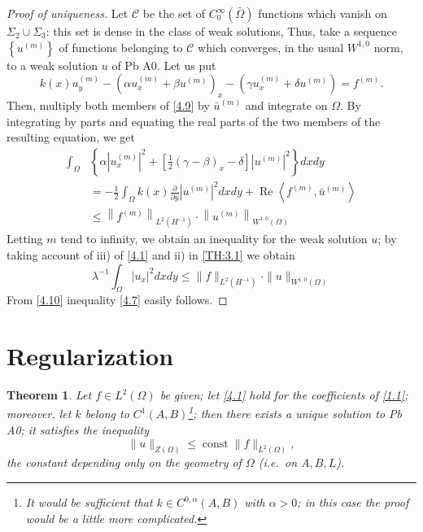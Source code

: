 \documentclass[a4paper,12pt,leqno]{article}
\newtheorem{theorem}[proposition]{Theorem}
\numberwithin{equation}{section}
\begin{document}
\newpage

\begin{proof}[Proof of uniqueness]
	Let $\mathcal{C}$ be the set of $C_{0}^{\infty}(\bar{\Omega})$ functions which vanish on $\Sigma_{2} \cup \Sigma_{3}$: this set is dense in the class of weak solutions, Thus, take a sequence $\left\{u^{(m)}\right\}$ of functions belonging to $\mathcal{C}$ which converges, in the usual $W^{1,0}$ norm, to a weak solution $u$ of Pb A0. Let us put
	\begin{equation} \label{4.9}
		k(x) u_{y}^{(m)}-\left(\alpha u_{x}^{(m)}+\beta u^{(m)}\right)_{x}-\left(\gamma u_{x}^{(m)}+\delta u^{(m)}\right)=f^{(m)}.
	\end{equation}
	Then, multiply both members of \eqref{4.9} by $\bar{u}^{(m)}$ and integrate on $\Omega$. By integrating by parts and equating the real parts of the two members of the resulting equation, we get
	\begin{equation*}
		\begin{split}
			\int_{\Omega} & \left\{\alpha\left|u_{x}^{(m)}\right|^{2}+\left[\frac{1}{2}(\gamma-\beta)_{x}-\delta\right]\left|u^{(m)}\right|^2\right\} d x d y  \\
			&=-\frac{1}{2} \int_{\Omega} k(x) \frac{\partial}{\partial y}\left|u^{(m)}\right|^{2} d x d y+\operatorname{Re}\left\langle f^{(m)}, \bar{u}^{(m)}\right\rangle \\
			& \leqslant\left\|f^{(m)}\right\|_{L^{2}\left(H^{-1}\right)} \cdot\left\|u^{(m)}\right\|_{W^{1,0}(\Omega)}
		\end{split}
	\end{equation*}
	Letting $m$ tend to infinity, we obtain an inequality for the weak solution $u$; by taking account of iii) of \eqref{4.1} and ii) in \cref{TH:3.1} we obtain
	\begin{equation} \label{4.10}
		\lambda^{-1} \int_{\Omega}\left|u_{x}\right|^{2} d x d y \leqslant \|f\|_{L^{2}\left(H^{-1}\right)} \cdot \| u \|_{W^{1,0}(\Omega)}
	\end{equation}
	From \eqref{4.10} inequality \eqref{4.7} easily follows.
\end{proof}


\section{Regularization} \label{S5}

\begin{theorem} \label{TH:5.1}
	Let $f \in L^{2}(\Omega)$ be given; let \eqref{4.1} hold for the coefficients of \cref{1.1}; moreover, let $k$ belong to $C^{1}(A, B)$\footnote{\label{foot:3}It would be sufficient that $k \in C^{0,\alpha}(A,B)$ with $\alpha > 0$; in this case the proof would be a little more complicated.}; then there exists a unique solution to Pb A0; it satisfies the inequality
	\begin{equation} \label{5.1}
		\|u\|_{Z(\Omega)} \leqslant \operatorname{const} \|f\|_{L^{2}(\Omega)},
	\end{equation}
	the constant depending only on the geometry of $\Omega$ (i.e.\ on $A, B, L$).
\end{theorem}
\end{document}

